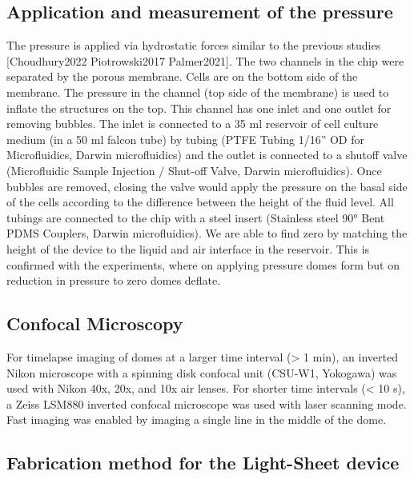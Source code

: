 \hypertarget{application-and-measurement-of-the-pressure}{%
	\subsection{Application and measurement of the
		pressure}\label{application-and-measurement-of-the-pressure}}

The pressure is applied via hydrostatic forces similar to the previous
studies {[}Choudhury2022 Piotrowski2017 Palmer2021{]}. The two channels
in the chip were separated by the porous membrane. Cells are on the
bottom side of the membrane. The pressure in the channel (top side of
the membrane) is used to inflate the structures on the top. This channel
has one inlet and one outlet for removing bubbles. The inlet is
connected to a 35 ml reservoir of cell culture medium (in a 50 ml falcon
tube) by tubing (PTFE Tubing 1/16'' OD for Microfluidics, Darwin
microfluidics) and the outlet is connected to a shutoff valve
(Microfluidic Sample Injection / Shut-off Valve, Darwin microfluidics).
Once bubbles are removed, closing the valve would apply the pressure on
the basal side of the cells according to the difference between the
height of the fluid level. All tubings are connected to the chip with a
steel insert (Stainless steel 90° Bent PDMS Couplers, Darwin
microfluidics). We are able to find zero by matching the height of the
device to the liquid and air interface in the reservoir. This is
confirmed with the experiments, where on applying pressure domes form
but on reduction in pressure to zero domes deflate.

\hypertarget{confocal-microscopy}{%
	\subsection{Confocal Microscopy}\label{confocal-microscopy}}

For timelapse imaging of domes at a larger time interval (\textgreater{}
1 min), an inverted Nikon microscope with a spinning disk confocal unit
(CSU-W1, Yokogawa) was used with Nikon 40x, 20x, and 10x air lenses. For
shorter time intervals (\textless{} 10 s), a Zeiss LSM880 inverted
confocal microscope was used with laser scanning mode. Fast imaging was
enabled by imaging a single line in the middle of the dome.

\hypertarget{fabrication-method-for-the-light-sheet-device}{%
	\subsection{Fabrication method for the Light-Sheet
		device}\label{fabrication-method-for-the-light-sheet-device}}


